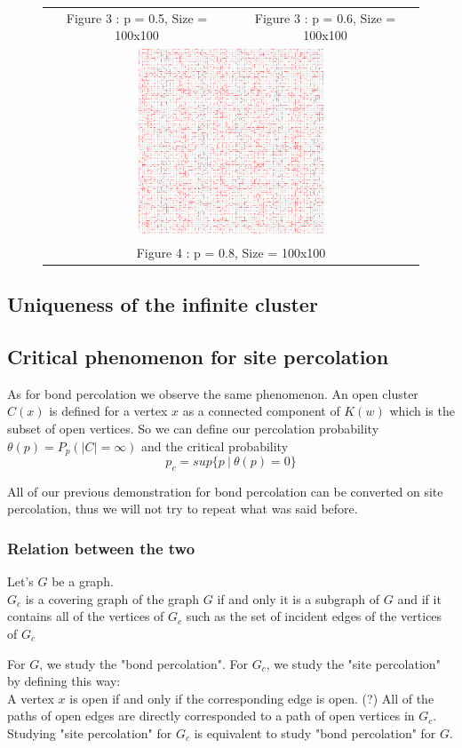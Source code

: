 \documentclass{article}
\begin{document}
\begin{figure}
\begin{tabular}{cc}
Figure 3 : p = 0.5, Size = 100x100 & Figure 3 : p = 0.6, Size = 100x100 \\[6pt]
\multicolumn{2}{c}{\includegraphics[width=55mm]{perc_80_2} }\\
\multicolumn{2}{c}{Figure 4 : p = 0.8, Size = 100x100}
\end{tabular}
\end{figure}

\subsection{Uniqueness of the infinite cluster}

\subsection{Critical phenomenon for site percolation}

As for bond percolation we observe the same phenomenon. An open cluster $C(x)$ is defined for a vertex $x$ as a connected component of $K(w)$ which is the subset of open vertices.
So we can define our percolation probability $\theta(p) = P_p(|C|=\infty)$ and the critical probability 
$$p_c = sup\{p \ | \ \theta(p) = 0 \}$$

All of our previous demonstration for bond percolation can be converted on site percolation, thus we will not try to repeat what was said before.

\subsubsection{Relation between the two}

Let's $G$ be a graph. \\
$G_c$ is a covering graph of the graph $G$ if and only it is a subgraph of $G$ and if it contains all of the vertices of $G_c$ such as the set of incident edges of the vertices of $G_c$

For $G$, we study the "bond percolation". For $G_c$, we study the "site percolation" by defining this way:\\
A vertex $x$ is open if and only if the corresponding edge is open. (?)
All of the paths of open edges are directly corresponded to a path of open vertices in $G_c$. Studying "site percolation" for $G_c$ is equivalent to study "bond percolation" for $G$.
\end{document}
